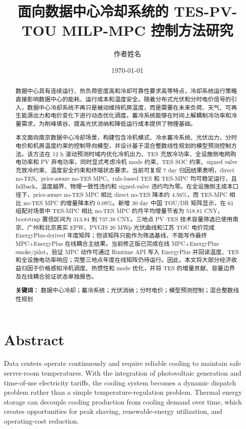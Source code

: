 \documentclass[UTF8,a4paper,12pt]{ctexrep}
\title{面向数据中心冷却系统的 TES-PV-TOU MILP-MPC 控制方法研究}
\author{作者姓名}
\date{\today}
\begin{document}
\maketitle

\begin{abstract}
数据中心具有连续运行、热负荷密度高和冷却可靠性要求高等特点，冷却系统运行策略直接影响数据中心的能耗、运行成本和温度安全。随着分布式光伏和分时电价信号的引入，数据中心冷却系统不再只是被动维持机房温度，而是需要在未来负荷、天气、可再生能源出力和电价变化下进行动态优化调度。蓄冷系统能够在时间上解耦制冷功率和冷量需求，为削峰填谷、提高光伏消纳和降低运行成本提供了物理基础。

本文面向南京数据中心冷却场景，构建包含冷机模式、冷水蓄冷系统、光伏出力、分时电价和机房温度约束的控制导向模型，并设计基于混合整数线性规划的模型预测控制方法。该方法在 12 h 滚动预测时域内优化冷机出力、TES 充放冷功率、全设施侧电网购电功率和 PV 弃电功率，同时显式考虑冷机 mode 约束、TES SOC 约束、signed valve 充放冷约束、温度安全约束和终端状态要求。当前可复现 7 day 归因结果表明，direct no-TES、price-aware no-TES MPC、rule-based TES 和 TES-MPC 均可稳定运行，且 fallback、温度越界、物理一致性违约和 signed-valve 违约均为零。在全设施侧主成本口径下，price-aware no-TES MPC 相比 direct no-TES 降本约 4.56\%，而 TES-MPC 相比 no-TES MPC 的增量降本约 0.09\%。新增 30 day 中国 TOU/DR 矩阵显示，在 61 组配对场景中 TES-MPC 相比 no-TES MPC 的月平均增量节省为 518.81 CNY，bootstrap 置信区间为 313.84 到 737.38 CNY。三地点 PV--TES 技术容量筛选已使用南京、广州和北京真实 EPW、PVGIS 20 MWp 光伏曲线和江苏 TOU 电价完成 EnergyPlus-derived 年度矩阵；但该矩阵只能作为筛选基线，不能写作最终 MPC+EnergyPlus 在线耦合主结果。当前修正版已完成在线 MPC+EnergyPlus smoke/pilot，验证 MPC 动作可通过 Runtime API 写入 EnergyPlus 并回读温度、TES 和全设施电功率响应；完整三地点年度在线矩阵仍待运行。因此，本文将大部分经济收益归因于价格感知冷机调度、热惯性和 mode 优化，并将 TES 的增量贡献、容量边界及在线耦合验证状态单独报告。

\textbf{关键词：} 数据中心冷却；蓄冷系统；光伏消纳；分时电价；模型预测控制；混合整数线性规划
\end{abstract}

\chapter*{Abstract}
Data centers operate continuously and require reliable cooling to maintain safe server-room temperatures. With the integration of photovoltaic generation and time-of-use electricity tariffs, the cooling system becomes a dynamic dispatch problem rather than a simple temperature-regulation problem. Thermal energy storage can decouple cooling production from cooling demand over time, which creates opportunities for peak shaving, renewable-energy utilization, and operating-cost reduction.
\end{document}
